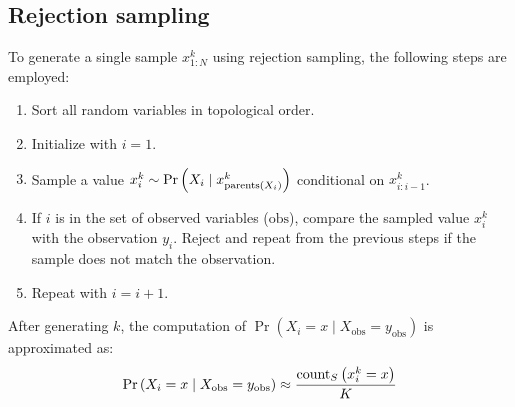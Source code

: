\subsection{Rejection sampling}
To generate a single sample $x_{1:N}^k$ using rejection sampling, the following steps are employed:
\begin{enumerate}
    \item Sort all random variables in topological order. 
    \item Initialize with $i=1$.
    \item Sample a value $x_i^k \sim \Pr\left(X_i\mid x_{\textnormal{parents}(X_i)}^k\right)$ conditional on $x_{i:i-1}^k$. 
    \item If $i$ is in the set of observed variables ($\text{obs}$), compare the sampled value $x_i^k$ with the observation $y_i$. 
        Reject and repeat from the previous steps if the sample does not match the observation.
    \item Repeat with $i=i+1$.
\end{enumerate}
After generating $k$, the computation of $\Pr\left(X_i=x\mid X_{\text{obs}}=y_{\text{obs}}\right)$ is approximated as: 
\[\Pr\left(X_i=x\mid X_{\text{obs}}=y_{\text{obs}}\right) \approx \dfrac{\textnormal{count}_S\left( x_i^k=x \right)}{K}\]
